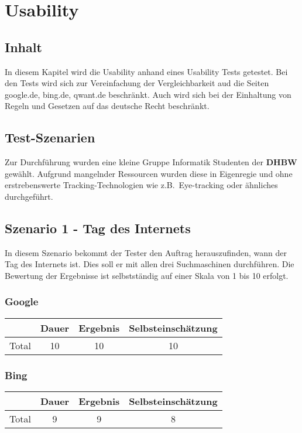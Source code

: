 \section{Usability}\label{sec:usability}

\subsection{Inhalt}\label{subsec:inhalt}
In diesem Kapitel wird die Usability anhand eines Usability Tests getestet.
Bei den Tests wird sich zur Vereinfachung der Vergleichbarkeit aud die Seiten google.de, bing.de, qwant.de beschränkt.
Auch wird sich bei der Einhaltung von Regeln und Gesetzen auf das deutsche Recht beschränkt.\newline

\subsection{Test-Szenarien}\label{subsec:szenarien}
Zur Durchführung wurden eine kleine Gruppe Informatik Studenten der \textbf{DHBW} gewählt.
Aufgrund mangelnder Ressourcen wurden diese in Eigenregie und ohne erstrebenswerte Tracking-Technologien wie z.B.\ Eye-tracking oder ähnliches durchgeführt.

\subsection{Szenario 1 - Tag des Internets}\label{subsec:szenario1}
In diesem Szenario bekommt der Tester den Auftrag herauszufinden, wann der Tag des Internets ist.
Dies soll er mit allen drei Suchmaschinen durchführen.
Die Bewertung der Ergebnisse ist selbstständig auf einer Skala von 1 bis 10 erfolgt.

\subsubsection*{Google}
\begin{tabular}{|c|c|c|c|}
    \hline
    & Dauer & Ergebnis & Selbsteinschätzung\\
    \hline
    Total & 10 & 10 & 10\\
    \hline
\end{tabular}

\subsubsection*{Bing}
\begin{tabular}{|c|c|c|c|}
    \hline
    & Dauer & Ergebnis & Selbsteinschätzung\\
    \hline
    Total & 9 & 9 & 8\\
    \hline
\end{tabular}


